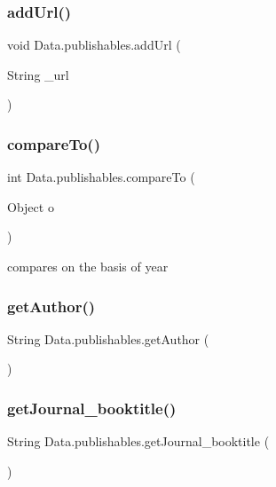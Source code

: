 \subsubsection{\texorpdfstring{add\+Url()}{addUrl()}}
{\footnotesize\ttfamily void Data.\+publishables.\+add\+Url (\begin{DoxyParamCaption}\item[{String}]{\+\_\+url }\end{DoxyParamCaption})}

\hypertarget{class_data_1_1publishables_a05a1e076d45e561c6e3d3f745849f650}{}\label{class_data_1_1publishables_a05a1e076d45e561c6e3d3f745849f650} 
\subsubsection{\texorpdfstring{compare\+To()}{compareTo()}}
{\footnotesize\ttfamily int Data.\+publishables.\+compare\+To (\begin{DoxyParamCaption}\item[{Object}]{o }\end{DoxyParamCaption})}



compares on the basis of year 

\hypertarget{class_data_1_1publishables_adb157b10f5a2a4fb9a842cc85e32f54b}{}\label{class_data_1_1publishables_adb157b10f5a2a4fb9a842cc85e32f54b} 
\subsubsection{\texorpdfstring{get\+Author()}{getAuthor()}}
{\footnotesize\ttfamily String Data.\+publishables.\+get\+Author (\begin{DoxyParamCaption}{ }\end{DoxyParamCaption})}

\hypertarget{class_data_1_1publishables_a7a83ab5278085e3fb9ea8f5b57860b0d}{}\label{class_data_1_1publishables_a7a83ab5278085e3fb9ea8f5b57860b0d} 
\subsubsection{\texorpdfstring{get\+Journal\+\_\+booktitle()}{getJournal\_booktitle()}}
{\footnotesize\ttfamily String Data.\+publishables.\+get\+Journal\+\_\+booktitle (\begin{DoxyParamCaption}{ }\end{DoxyParamCaption})}

